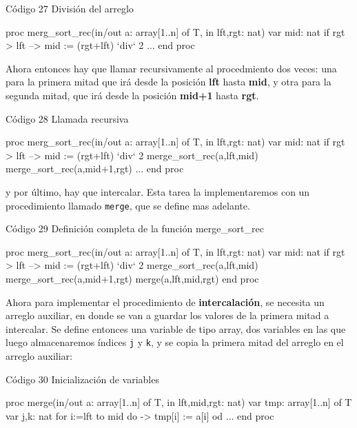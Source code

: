 \begin{codebox}{Código 27}
\footnotesize División del arreglo
\tcblower
\begin{pascallike}
proc merg_sort_rec(in/out a: array[1..n] of T, in lft,rgt: nat)
    var mid: nat
    if rgt > lft --> mid := (rgt+lft) `div` 2
    ...
end proc
\end{pascallike}
\end{codebox}
Ahora entonces hay que llamar recursivamente al procedmiento dos veces: una para la primera mitad que irá desde la posición \textbf{lft} hasta \textbf{mid}, y otra para la segunda mitad, que irá desde la posición \textbf{mid+1} hasta \textbf{rgt}.
\begin{codebox}{Código 28}
\footnotesize Llamada recursiva
\tcblower
\begin{pascallike}
proc merg_sort_rec(in/out a: array[1..n] of T, in lft,rgt: nat)
    var mid: nat
    if rgt > lft --> mid := (rgt+lft) `div` 2
    merge_sort_rec(a,lft,mid)
    merge_sort_rec(a,mid+1,rgt)
    ...
end proc
\end{pascallike}
\end{codebox}
y por último, hay que intercalar. Esta tarea la implementaremos con un procedimiento llamado \texttt{merge}, que se define mas adelante.
\begin{codebox}{Código 29}
\footnotesize Definición completa de la función merge\_sort\_rec
\tcblower
\begin{pascallike}
proc merg_sort_rec(in/out a: array[1..n] of T, in lft,rgt: nat)
    var mid: nat
    if rgt > lft --> mid := (rgt+lft) `div` 2
    merge_sort_rec(a,lft,mid)
    merge_sort_rec(a,mid+1,rgt)
    merge(a,lft,mid,rgt)
end proc
\end{pascallike}
\end{codebox}
Ahora para implementar el procedimiento de \textbf{intercalación}, se necesita un arreglo auxiliar, en donde se van a guardar los valores de la primera mitad a intercalar.
Se define entonces una variable de tipo array, dos variables en las que luego almacenaremos índices \texttt{j} y \texttt{k}, y se copia la primera mitad del arreglo en el arreglo auxiliar:
\begin{codebox}{Código 30}
\footnotesize Inicialización de variables
\tcblower
\begin{pascallike}
proc merge(in/out a: array[1..n] of T, in lft,mid,rgt: nat)
    var tmp: array[1..n] of T
    var j,k: nat
    for i:=lft to mid do ->
        tmp[i] := a[i] 
    od
    ...
end proc
\end{pascallike}
\end{codebox}

